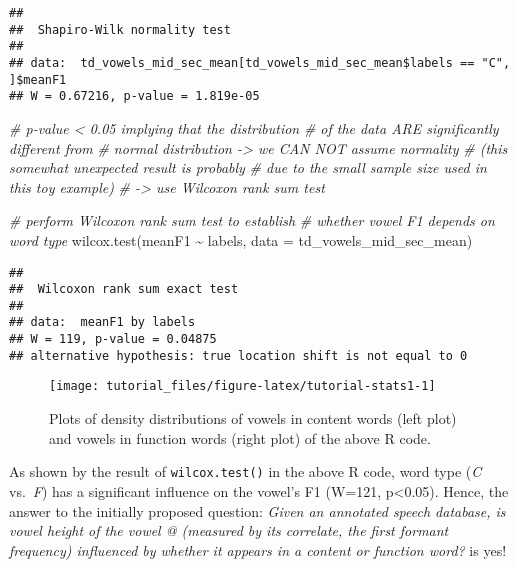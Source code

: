 \documentclass[
]{book}
\newenvironment{Shaded}{\begin{snugshade}}{\end{snugshade}}
\newcommand{\AttributeTok}[1]{\textcolor[rgb]{0.77,0.63,0.00}{#1}}
\newcommand{\CommentTok}[1]{\textcolor[rgb]{0.56,0.35,0.01}{\textit{#1}}}
\newcommand{\FunctionTok}[1]{\textcolor[rgb]{0.00,0.00,0.00}{#1}}
\newcommand{\NormalTok}[1]{#1}
\newcommand{\SpecialCharTok}[1]{\textcolor[rgb]{0.00,0.00,0.00}{#1}}
\begin{document}
\begin{verbatim}
## 
##  Shapiro-Wilk normality test
## 
## data:  td_vowels_mid_sec_mean[td_vowels_mid_sec_mean$labels == "C", ]$meanF1
## W = 0.67216, p-value = 1.819e-05
\end{verbatim}

\begin{Shaded}
\begin{Highlighting}[]
\CommentTok{\# p{-}value \textless{} 0.05 implying that the distribution}
\CommentTok{\# of the data ARE significantly different from}
\CommentTok{\# normal distribution {-}\textgreater{} we CAN NOT assume normality}
\CommentTok{\# (this somewhat unexpected result is probably}
\CommentTok{\# due to the small sample size used in this toy example)}
\CommentTok{\# {-}\textgreater{} use Wilcoxon rank sum test}

\CommentTok{\# perform Wilcoxon rank sum test to establish}
\CommentTok{\# whether vowel F1 depends on word type}
\FunctionTok{wilcox.test}\NormalTok{(meanF1 }\SpecialCharTok{\textasciitilde{}}\NormalTok{ labels, }\AttributeTok{data =}\NormalTok{ td\_vowels\_mid\_sec\_mean)}
\end{Highlighting}
\end{Shaded}

\begin{verbatim}
## 
##  Wilcoxon rank sum exact test
## 
## data:  meanF1 by labels
## W = 119, p-value = 0.04875
## alternative hypothesis: true location shift is not equal to 0
\end{verbatim}

\begin{figure}

{\centering \texttt{[image: tutorial\_files/figure-latex/tutorial-stats1-1]} 

}

\caption{Plots of density distributions of vowels in content words (left plot) and vowels in function words (right plot) of the above R code.}\label{fig:tutorial-stats1}
\end{figure}

As shown by the result of \texttt{wilcox.test()} in the above R code, word type (\emph{C} vs.~\emph{F}) has a significant influence on the vowel's F1 (W=121, p\textless0.05). Hence, the answer to the initially proposed question: \emph{Given an annotated speech database, is vowel height of the vowel @ (measured by its correlate, the first formant frequency) influenced by whether it appears in a content or function word?} is yes!
\end{document}
